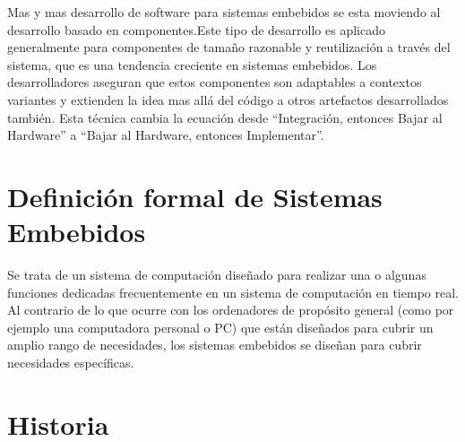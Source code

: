 \documentclass[12pt,twoside]{book}
\begin{document}
Mas y mas desarrollo de software para sistemas embebidos se esta moviendo al desarrollo basado en componentes.Este tipo de desarrollo es aplicado generalmente para componentes de tamaño razonable y reutilización a través del sistema, que es una tendencia creciente en sistemas embebidos. Los desarrolladores aseguran que estos componentes son adaptables a contextos variantes y extienden la idea mas allá del código a otros artefactos desarrollados también. Esta técnica cambia la ecuación desde ``Integración, entonces Bajar al Hardware'' a ``Bajar al Hardware, entonces Implementar''.

\section{Definición formal de Sistemas Embebidos}

Se trata de un sistema de computación diseñado  para realizar una o algunas funciones dedicadas frecuentemente en un sistema de computación en tiempo real. Al contrario de lo que ocurre con los ordenadores de propósito general (como por ejemplo una computadora personal o PC) que están diseñados para cubrir un amplio rango de necesidades, los sistemas embebidos se diseñan para cubrir necesidades específicas.

\section{Historia}





\end{document}
